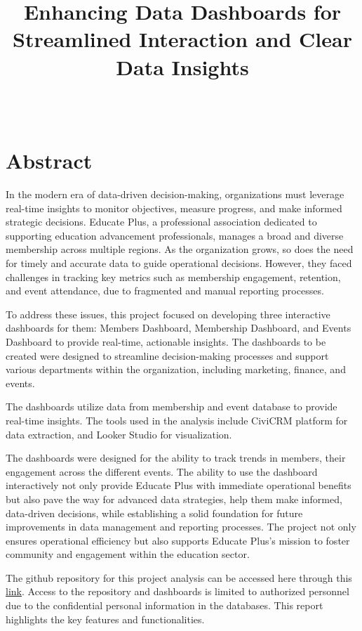 \documentclass[11pt,a4paper,]{article}
\title{Enhancing Data Dashboards for Streamlined Interaction and Clear Data Insights}
\author{\sf{\Large\textbf{Akanksha Shridharani}\\\large Masters of Business Analytics\\[0.5cm]}{\Large\textbf{Pranav Shankaran}\\\large Masters of Business Analytics\\[0.5cm]}}
\date{\sf\Date~\Month~\Year}
\makeatletter
\def\titlepage{\front{\expandafter{\@title}}{\@author}{\@organization}}
\makeatother
\begin{document}
\titlepage

{
\setcounter{tocdepth}{2}
\tableofcontents
}
\section{Abstract}\label{abstract}

In the modern era of data-driven decision-making, organizations must leverage real-time insights to monitor objectives, measure progress, and make informed strategic decisions. Educate Plus, a professional association dedicated to supporting education advancement professionals, manages a broad and diverse membership across multiple regions. As the organization grows, so does the need for timely and accurate data to guide operational decisions. However, they faced challenges in tracking key metrics such as membership engagement, retention, and event attendance, due to fragmented and manual reporting processes.

To address these issues, this project focused on developing three interactive dashboards for them: Members Dashboard, Membership Dashboard, and Events Dashboard to provide real-time, actionable insights. The dashboards to be created were designed to streamline decision-making processes and support various departments within the organization, including marketing, finance, and events.

The dashboards utilize data from membership and event database to provide real-time insights. The tools used in the analysis include CiviCRM platform for data extraction, and Looker Studio for visualization.

The dashboards were designed for the ability to track trends in members, their engagement across the different events. The ability to use the dashboard interactively not only provide Educate Plus with immediate operational benefits but also pave the way for advanced data strategies, help them make informed, data-driven decisions, while establishing a solid foundation for future improvements in data management and reporting processes. The project not only ensures operational efficiency but also supports Educate Plus's mission to foster community and engagement within the education sector.

The github repository for this project analysis can be accessed here through this \href{https://github.com/akanksha03042001/ETC5543-EducatePlus}{link}. Access to the repository and dashboards is limited to authorized personnel due to the confidential personal information in the databases. This report highlights the key features and functionalities.
\end{document}
